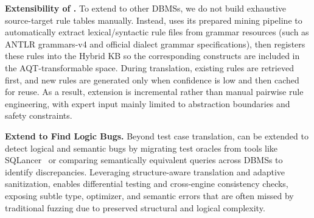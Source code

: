 \documentclass[sigconf,review,anonymous]{acmart}
\begin{document}
\textbf{Extensibility of \tool{}. }
To extend \tool{} to other DBMSs, we do not build exhaustive source-target rule tables manually. Instead, \tool{} uses its prepared mining pipeline to automatically extract lexical/syntactic rule files from grammar resources (such as ANTLR grammars-v4 and official dialect grammar specifications), then registers these rules into the Hybrid KB so the corresponding constructs are included in the AQT-transformable space. During translation, existing rules are retrieved first, and new rules are generated only when confidence is low and then cached for reuse. As a result, extension is incremental rather than manual pairwise rule engineering, with expert input mainly limited to abstraction boundaries and safety constraints.

\textbf{Extend \tool{} to Find Logic Bugs.} 
Beyond test case translation, \tool{} can be extended to detect logical and semantic bugs by migrating test oracles from tools like SQLancer~\cite{sqlancer} or comparing semantically equivalent queries across DBMSs to identify discrepancies. Leveraging structure-aware translation and adaptive sanitization, \tool{} enables differential testing and cross-engine consistency checks, exposing subtle type, optimizer, and semantic errors that are often missed by traditional fuzzing due to preserved structural and logical complexity.

\end{document}
